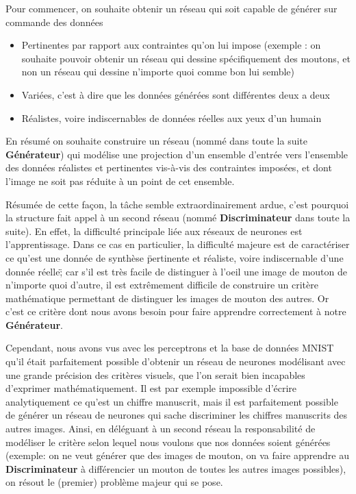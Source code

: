 Pour commencer, on souhaite obtenir un réseau qui soit capable de générer sur commande des données 
\begin{itemize}
    \item Pertinentes par rapport aux contraintes qu'on lui impose (exemple : on souhaite pouvoir obtenir un réseau qui dessine spécifiquement des moutons, et non un réseau qui dessine n'importe quoi comme bon lui semble)
    \item Variées, c'est à dire que les données générées sont différentes deux a deux
    \item Réalistes, voire indiscernables de données réelles aux yeux d'un humain \\
\end{itemize} 

En résumé on souhaite construire un réseau (nommé dans toute la suite \textbf{Générateur}) qui modélise une projection d'un ensemble d'entrée vers l'ensemble des données réalistes et pertinentes vis-à-vis des contraintes imposées, et dont l'image ne soit pas réduite à un point de cet ensemble.

Résumée de cette façon, la tâche semble extraordinairement ardue, c'est pourquoi la structure fait appel à un second réseau (nommé \textbf{Discriminateur} dans toute la suite). En effet, la difficulté principale liée aux réseaux de neurones est l'apprentissage. Dans ce cas en particulier, la difficulté majeure  est de caractériser ce qu'est une donnée de synthèse \"pertinente et réaliste, voire indiscernable d'une donnée réelle\"; car s'il est très facile de distinguer à l'oeil une image de mouton de n'importe quoi d'autre, il est extrêmement difficile de construire un critère mathématique permettant de distinguer les images de mouton des autres. Or c'est ce critère dont nous avons besoin pour faire apprendre correctement à notre \textbf{Générateur}.

Cependant, nous avons vus avec les perceptrons et la base de données MNIST qu'il était parfaitement possible d'obtenir un réseau de neurones modélisant avec une grande précision des critères visuels, que l'on serait bien incapables d'exprimer mathématiquement. Il est par exemple impossible d'écrire analytiquement ce qu'est un chiffre manuscrit, mais il est parfaitement possible de générer un réseau de neurones qui sache discriminer les chiffres manuscrits des autres images. Ainsi, en déléguant à un second réseau la responsabilité de modéliser le critère selon lequel nous voulons que nos données soient générées (exemple: on ne veut générer que des images de mouton, on va faire apprendre au \textbf{Discriminateur} à différencier un mouton de toutes les autres images possibles), on résout le (premier) problème majeur qui se pose. 

